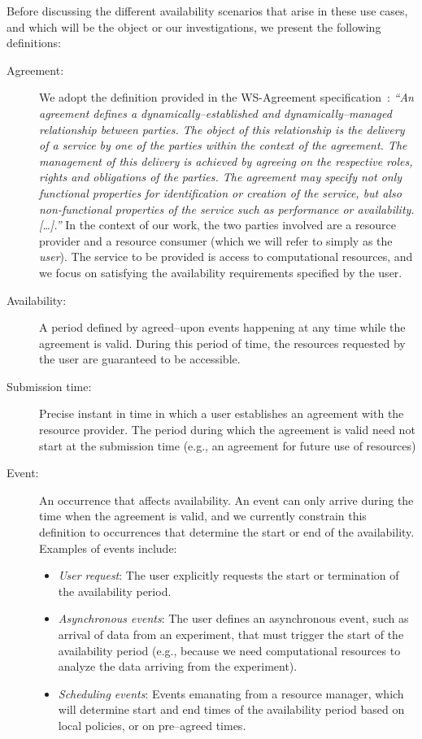 \documentclass[singlespace]{ccw_chithesis}
\begin{document}
Before discussing the different availability scenarios that arise in these use cases, and which will be the object or our investigations, we present the following definitions:

\begin{description}
\item[Agreement:]  We adopt the definition provided in the WS-Agreement specification~\cite{wasg}: \emph{``An agreement defines a dynamically--established and dynamically--managed relationship between parties. The object of this relationship is the delivery
of a service by one of the parties within the context of the agreement. The management of this delivery is achieved by agreeing on the respective roles, rights and obligations of the parties. The agreement may specify not only functional properties for identification or creation of the service, but also non-functional properties of the service such as performance or availability. [\ldots].''} In the context of our work, the two parties involved are a resource provider and a resource consumer (which we will refer to simply as the \emph{user}). The service to be provided is access to computational resources, and we focus on satisfying the availability requirements specified by the user.
\item[Availability:] A period defined by agreed--upon events happening at any time while the agreement is valid. During this period of time, the resources requested by the user are guaranteed to be accessible.
\item[Submission time:] Precise instant in time in which a user establishes an agreement with the resource provider. The period during which the agreement is valid need not start at the submission time (e.g., an agreement for future use of resources)
\item[Event:] An occurrence that affects availability. An event can only arrive during the time when the agreement is valid, and we currently constrain this definition to occurrences that determine the start or end of the availability. Examples of events include:
\begin{itemize}
\item \emph{User request}: The user explicitly requests the start or termination of the availability period.
\item \emph{Asynchronous events}: The user defines an asynchronous event, such as arrival of data from an experiment, that must trigger the start of the availability period (e.g., because we need computational resources to analyze the data arriving from the experiment).
\item \emph{Scheduling events}: Events emanating from a resource manager, which will determine start and end times of the availability period based on local policies, or on pre--agreed times.
\end{itemize}
\end{description}
\end{document}
